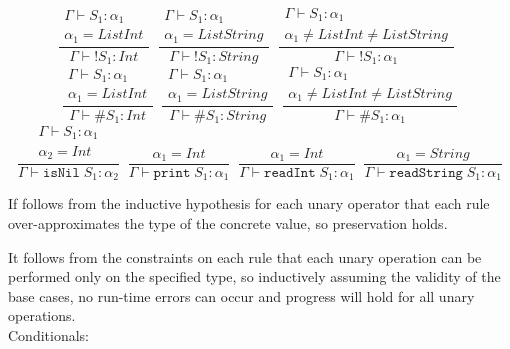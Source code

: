 \documentclass[10pt]{article} %
\begin{document}
\begin{enumerate}
$$\frac{\begin{matrix} \Gamma \vdash S_1 : \alpha_1 \\ \alpha_1 = ListInt\end{matrix}}{\Gamma \vdash \texttt{!}S_1 : Int}\;\;
\frac{\begin{matrix} \Gamma \vdash S_1 : \alpha_1 \\ \alpha_1 = ListString\end{matrix}}{\Gamma \vdash \texttt{!}S_1 : String}\;\;
\frac{\begin{matrix} \Gamma \vdash S_1 : \alpha_1 \\ \alpha_1 \not = ListInt \not = ListString\end{matrix}}{\Gamma \vdash \texttt{!}S_1 : \alpha_1}\;\;$$
$$\frac{\begin{matrix} \Gamma \vdash S_1 : \alpha_1 \\ \alpha_1 = ListInt\end{matrix}}{\Gamma \vdash \texttt{\#}S_1 : Int}\;\;
\frac{\begin{matrix} \Gamma \vdash S_1 : \alpha_1 \\ \alpha_1 = ListString\end{matrix}}{\Gamma \vdash \texttt{\#}S_1 : String}\;\;
\frac{\begin{matrix} \Gamma \vdash S_1 : \alpha_1 \\ \alpha_1 \not= ListInt\not = ListString\end{matrix}}{\Gamma \vdash \texttt{\#}S_1 : \alpha_1}$$
$$\frac{\begin{matrix}\Gamma \vdash S_1 : \alpha_1 \\ \alpha_2 = Int\end{matrix}}{\Gamma \vdash \texttt{isNil}\; S_1: \alpha_2}\;\;
\frac{\alpha_1 = Int}{\Gamma \vdash \texttt{print}\; S_1: \alpha_1}\;\;
\frac{\alpha_1 = Int}{\Gamma \vdash \texttt{readInt}\; S_1 : \alpha_1}\;\;
\frac{\alpha_1 = String}{\Gamma \vdash \texttt{readString}\; S_1 : \alpha_1}$$

If follows from the inductive hypothesis for each unary operator that each rule over-approximates the type of the concrete value, so preservation holds.

It follows from the constraints on each rule that each unary operation can be performed only on the specified type, so inductively assuming the validity of the base cases, no run-time errors can occur and progress will hold for all unary operations.\\

Conditionals:


\end{enumerate}
\end{document}

